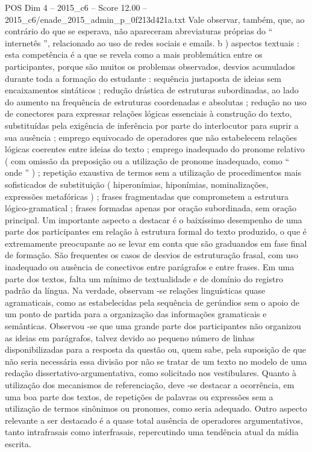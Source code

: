 \begin{textsample}{POS Dim 4 – 2015\_c6 – Score 12.00 – 2015\_c6/enade\_2015\_admin\_p\_0f213d421a.txt}
Vale observar, também, que, ao contrário do que se esperava, não apareceram abreviaturas próprias do “ internetês ”, relacionado ao uso de redes sociais e emails. b ) aspectos textuais : esta competência é a que se revela como a mais problemática entre os participantes, porque são muitos os problemas observados, desvios acumulados durante toda a formação do estudante : sequência justaposta de ideias sem encaixamentos sintáticos ; redução drástica de estruturas subordinadas, ao lado do aumento na frequência de estruturas coordenadas e absolutas ; redução no uso de conectores para expressar relações lógicas essenciais à construção do texto, substituídas pela exigência de inferência por parte do interlocutor para suprir a sua ausência ; emprego equivocado de operadores que não estabelecem relações lógicas coerentes entre ideias do texto ; emprego inadequado do pronome relativo ( com omissão da preposição ou a utilização de pronome inadequado, como “ onde ” ) ; repetição exaustiva de termos sem a utilização de procedimentos mais sofisticados de substituição ( hiperonímias, hiponímias, nominalizações, expressões metafóricas ) ; frases fragmentadas que comprometem a estrutura lógico-gramatical ; frases formadas apenas por oração subordinada, sem oração principal.
Um importante aspecto a destacar é o baixíssimo desempenho de uma parte dos participantes em relação à estrutura formal do texto produzido, o que é extremamente preocupante ao se levar em conta que são graduandos em fase final de formação.
São frequentes os casos de desvios de estruturação frasal, com uso inadequado ou ausência de conectivos entre parágrafos e entre frases.
Em uma parte dos textos, falta um mínimo de textualidade e de domínio do registro padrão da língua.
Na verdade, observam -se relações linguísticas quase agramaticais, como as estabelecidas pela sequência de gerúndios sem o apoio de um ponto de partida para a organização das informações gramaticais e semânticas.
Observou -se que uma grande parte dos participantes não organizou as ideias em parágrafos, talvez devido ao pequeno número de linhas disponibilizadas para a resposta da questão ou, quem sabe, pela suposição de que não seria necessária essa divisão por não se tratar de um texto no modelo de uma redação dissertativo-argumentativa, como solicitado nos vestibulares.
Quanto à utilização dos mecanismos de referenciação, deve -se destacar a ocorrência, em uma boa parte dos textos, de repetições de palavras ou expressões sem a utilização de termos sinônimos ou pronomes, como seria adequado.
Outro aspecto relevante a ser destacado é a quase total ausência de operadores argumentativos, tanto intrafrasais como interfrasais, repercutindo uma tendência atual da mídia escrita.

\end{textsample}
